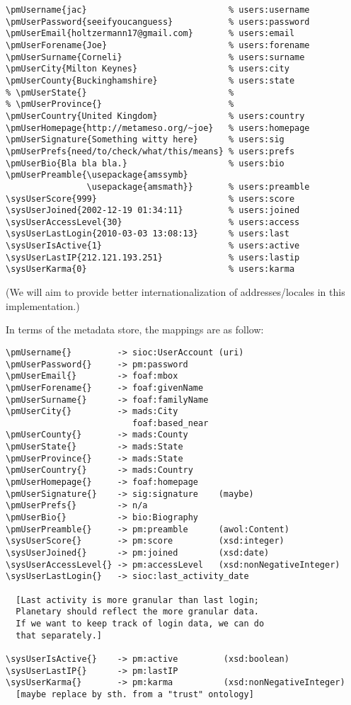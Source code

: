 \documentclass{article}
\begin{document}
\begin{verbatim}
\pmUsername{jac}                            % users:username
\pmUserPassword{seeifyoucanguess}           % users:password
\pmUserEmail{holtzermann17@gmail.com}       % users:email
\pmUserForename{Joe}                        % users:forename
\pmUserSurname{Corneli}                     % users:surname
\pmUserCity{Milton Keynes}                  % users:city
\pmUserCounty{Buckinghamshire}              % users:state
% \pmUserState{}                            %
% \pmUserProvince{}                         %
\pmUserCountry{United Kingdom}              % users:country
\pmUserHomepage{http://metameso.org/~joe}   % users:homepage
\pmUserSignature{Something witty here}      % users:sig
\pmUserPrefs{need/to/check/what/this/means} % users:prefs
\pmUserBio{Bla bla bla.}                    % users:bio
\pmUserPreamble{\usepackage{amssymb}
                \usepackage{amsmath}}       % users:preamble
\sysUserScore{999}                          % users:score
\sysUserJoined{2002-12-19 01:34:11}         % users:joined
\sysUserAccessLevel{30}                     % users:access
\sysUserLastLogin{2010-03-03 13:08:13}      % users:last
\sysUserIsActive{1}                         % users:active
\sysUserLastIP{212.121.193.251}             % users:lastip
\sysUserKarma{0}                            % users:karma
\end{verbatim}

(We will aim to provide better internationalization of
addresses/locales in this implementation.)

In terms of the metadata store, the mappings are as
follow:

\begin{verbatim}
\pmUsername{}         -> sioc:UserAccount (uri)
\pmUserPassword{}     -> pm:password
\pmUserEmail{}        -> foaf:mbox
\pmUserForename{}     -> foaf:givenName
\pmUserSurname{}      -> foaf:familyName
\pmUserCity{}         -> mads:City
                         foaf:based_near
\pmUserCounty{}       -> mads:County
\pmUserState{}        -> mads:State
\pmUserProvince{}     -> mads:State
\pmUserCountry{}      -> mads:Country
\pmUserHomepage{}     -> foaf:homepage
\pmUserSignature{}    -> sig:signature    (maybe)
\pmUserPrefs{}        -> n/a
\pmUserBio{}          -> bio:Biography
\pmUserPreamble{}     -> pm:preamble      (awol:Content)
\sysUserScore{}       -> pm:score         (xsd:integer)
\sysUserJoined{}      -> pm:joined        (xsd:date)
\sysUserAccessLevel{} -> pm:accessLevel   (xsd:nonNegativeInteger)
\sysUserLastLogin{}   -> sioc:last_activity_date

  [Last activity is more granular than last login;
  Planetary should reflect the more granular data.
  If we want to keep track of login data, we can do
  that separately.]

\sysUserIsActive{}    -> pm:active         (xsd:boolean)
\sysUserLastIP{}      -> pm:lastIP
\sysUserKarma{}       -> pm:karma          (xsd:nonNegativeInteger)
  [maybe replace by sth. from a "trust" ontology]
\end{verbatim}
\end{document}
